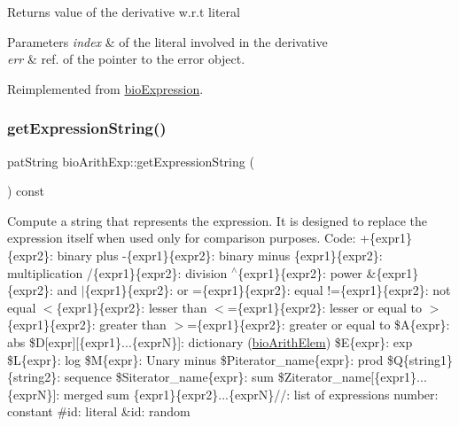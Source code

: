 \begin{DoxyReturn}{Returns}
value of the derivative w.\+r.\+t literal 
\end{DoxyReturn}

\begin{DoxyParams}{Parameters}
{\em index} & of the literal involved in the derivative \\
\hline
{\em err} & ref. of the pointer to the error object. \\
\hline
\end{DoxyParams}


Reimplemented from \hyperlink{classbio_expression_a5915579d1193f25f216c1e273c97f2ce}{bio\+Expression}.

\mbox{\label{classbio_arith_exp_a3bf86cc33d7879bdf4e9e420890f6851}} 
\subsubsection{\texorpdfstring{get\+Expression\+String()}{getExpressionString()}}
{\footnotesize\ttfamily pat\+String bio\+Arith\+Exp\+::get\+Expression\+String (\begin{DoxyParamCaption}{ }\end{DoxyParamCaption}) const\hspace{0.3cm}{\ttfamily [virtual]}}

Compute a string that represents the expression. It is designed to replace the expression itself when used only for comparison purposes. Code\+: +\{expr1\}\{expr2\}\+: binary plus -\/\{expr1\}\{expr2\}\+: binary minus \{expr1\}\{expr2\}\+: multiplication /\{expr1\}\{expr2\}\+: division $^\wedge$\{expr1\}\{expr2\}\+: power \&\{expr1\}\{expr2\}\+: and $\vert$\{expr1\}\{expr2\}\+: or =\{expr1\}\{expr2\}\+: equal !=\{expr1\}\{expr2\}\+: not equal $<$\{expr1\}\{expr2\}\+: lesser than $<$=\{expr1\}\{expr2\}\+: lesser or equal to $>$\{expr1\}\{expr2\}\+: greater than $>$=\{expr1\}\{expr2\}\+: greater or equal to \$A\{expr\}\+: abs \$D\mbox{[}expr\mbox{]}\mbox{[}\{expr1\}...\{exprN\}\mbox{]}\+: dictionary (\hyperlink{classbio_arith_elem}{bio\+Arith\+Elem}) \$E\{expr\}\+: exp \$L\{expr\}\+: log \$M\{expr\}\+: Unary minus \$\+Piterator\+\_\+name\{expr\}\+: prod \$Q\{string1\}\{string2\}\+: sequence \$\+Siterator\+\_\+name\{expr\}\+: sum \$\+Ziterator\+\_\+name\mbox{[}\{expr1\}...\{exprN\}\mbox{]}\+: merged sum \{expr1\}\{expr2\}...\{exprN\}//\+: list of expressions number\+: constant \#id\+: literal \&id\+: random 

